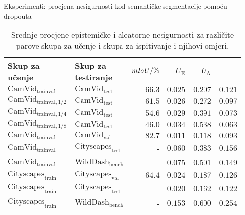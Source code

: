 \documentclass{beamer}
\begin{document}
\begin{frame}{Eksperimenti: procjena nesigurnosti kod semantičke segmentacije pomoću dropouta}
	\begin{table}
		\centering\footnotesize
	\begin{tabular}{llrrrr}
		\toprule
		\bfseries \makecell[l]{Skup za\\ učenje} & \bfseries \makecell[l]{Skup za\\ testiranje} & $\mathit{mIoU}/\%$ & $U_\text{E}$ & $U_\text{A}$  & \makecell[r]{$\frac{U_\text{E}}{U_\text{A}}$} \\
		\midrule
		$\text{CamVid}_\text{trainval}$ & $\text{CamVid}_\text{test}$ & $66.3$ & $0.025$ & $0.207$ & $0.121$ \\
		$\text{CamVid}_{\text{trainval},1/2}$ & $\text{CamVid}_\text{test}$ & $61.5$ & $0.026$ & $0.272$ & $0.097$ \\
		$\text{CamVid}_{\text{trainval},1/4}$ & $\text{CamVid}_\text{test}$ & $54.6$ & $0.029$ & $0.391$ & $0.073$ \\
		$\text{CamVid}_{\text{trainval},1/8}$ & $\text{CamVid}_\text{test}$ & $46.0$ & $0.034$ & $0.538$ & $0.063$ \\
		\midrule
		$\text{CamVid}_\text{trainval}$     & $\text{CamVid}_\text{val}$ & $82.7$ & $0.011$ & $0.118$ & $0.093$ \\
		\midrule
		$\text{CamVid}_\text{trainval}$  & $\text{Cityscapes}_\text{test}$ &      -  & $0.060$ & $0.383$ & $0.156$ \\
		$\text{CamVid}_\text{trainval}$  & 	$\text{WildDash}_\text{bench}$	 &      -  & $0.075$ & $0.501$ & $0.149$ \\
		\midrule
		$\text{Cityscapes}_\text{train}$ & $\text{Cityscapes}_\text{val}$  & $64.4$ & $0.024$ & $0.187$ & $0.126$ \\
		$\text{Cityscapes}_\text{train}$ & $\text{Cityscapes}_\text{test}$ & -       & $0.020$ & $0.162$ & $0.122$ \\
		$\text{Cityscapes}_\text{train}$ & $\text{WildDash}_\text{bench}$  & - & $0.153$ & $0.600$ & $0.254$ \\
		\bottomrule
	\end{tabular}
		\caption{Srednje procjene epistemičke i aleatorne nesigurnosti za različite parove skupa za učenje i skupa za ispitivanje i njihovi omjeri.}
		\label{tab:epistemicka-aleatorna-ucenje-testiranje}
	\end{table}
\end{frame}
\end{document}
